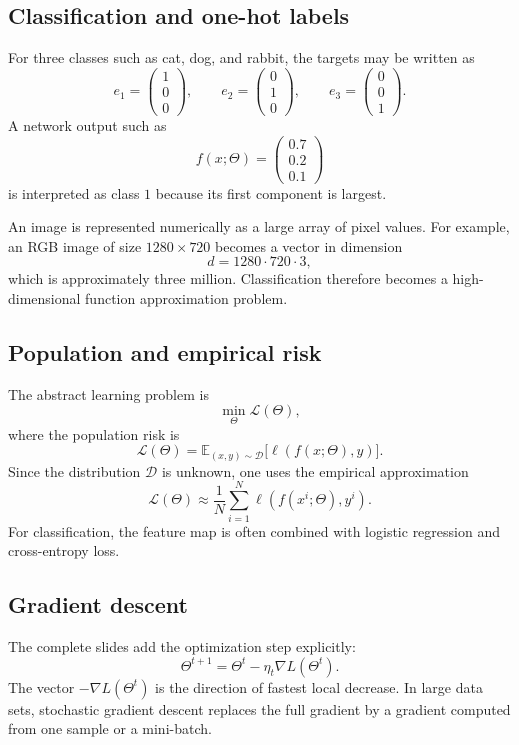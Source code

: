 \documentclass[11pt,a4paper]{article}
\theoremstyle{definition}
\theoremstyle{plain}
\theoremstyle{remark}
\begin{document}
\subsection{Classification and one-hot labels}
For three classes such as cat, dog, and rabbit, the targets may be written as
\[
  e_1=\begin{pmatrix}1\\0\\0\end{pmatrix},\qquad
  e_2=\begin{pmatrix}0\\1\\0\end{pmatrix},\qquad
  e_3=\begin{pmatrix}0\\0\\1\end{pmatrix}.
\]
A network output such as
\[
  f(x;\Theta)=\begin{pmatrix}0.7\\0.2\\0.1\end{pmatrix}
\]
is interpreted as class $1$ because its first component is largest.

An image is represented numerically as a large array of pixel values. For example, an RGB image of size $1280\times720$ becomes a vector in dimension
\[
  d=1280\cdot720\cdot3,
\]
which is approximately three million. Classification therefore becomes a high-dimensional function approximation problem.

\subsection{Population and empirical risk}
The abstract learning problem is
\[
  \min_\Theta \mathcal{L}(\Theta),
\]
where the population risk is
\[
  \mathcal{L}(\Theta)=\mathbb{E}_{(x,y)\sim\mathcal{D}}
  \bigl[\ell(f(x;\Theta),y)\bigr].
\]
Since the distribution $\mathcal{D}$ is unknown, one uses the empirical approximation
\[
  \mathcal{L}(\Theta)\approx
  \frac1N\sum_{i=1}^N\ell(f(x^i;\Theta),y^i).
\]
For classification, the feature map is often combined with logistic regression and cross-entropy loss.

\subsection{Gradient descent}
The complete slides add the optimization step explicitly:
\[
  \Theta^{t+1}=\Theta^t-\eta_t\nabla L(\Theta^t).
\]
The vector $-\nabla L(\Theta^t)$ is the direction of fastest local decrease. In large data sets, stochastic gradient descent replaces the full gradient by a gradient computed from one sample or a mini-batch.
\end{document}
